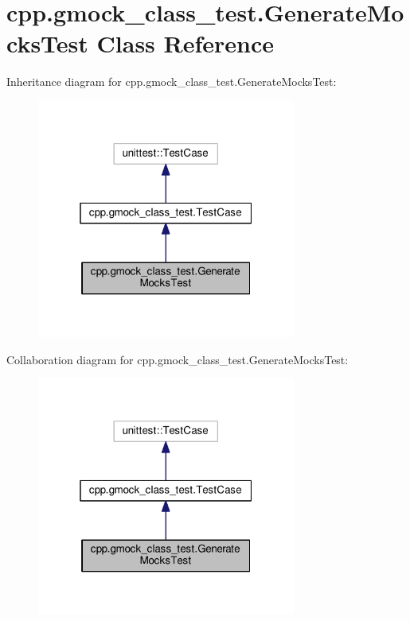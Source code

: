 \hypertarget{classcpp_1_1gmock__class__test_1_1GenerateMocksTest}{}\section{cpp.\+gmock\+\_\+class\+\_\+test.\+Generate\+Mocks\+Test Class Reference}
\label{classcpp_1_1gmock__class__test_1_1GenerateMocksTest}


Inheritance diagram for cpp.\+gmock\+\_\+class\+\_\+test.\+Generate\+Mocks\+Test\+:
\nopagebreak
\begin{figure}[H]
\begin{center}
\leavevmode
\includegraphics[width=241pt]{classcpp_1_1gmock__class__test_1_1GenerateMocksTest__inherit__graph}
\end{center}
\end{figure}


Collaboration diagram for cpp.\+gmock\+\_\+class\+\_\+test.\+Generate\+Mocks\+Test\+:
\nopagebreak
\begin{figure}[H]
\begin{center}
\leavevmode
\includegraphics[width=241pt]{classcpp_1_1gmock__class__test_1_1GenerateMocksTest__coll__graph}
\end{center}
\end{figure}
